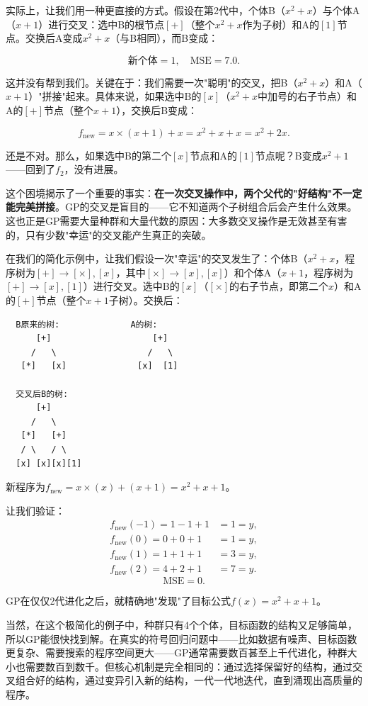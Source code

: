 \documentclass[lang=cn,zihao=-4,a4paper,fontset=windows]{beautybook}
\begin{document}
实际上，让我们用一种更直接的方式。假设在第2代中，个体B（$x^2 + x$）与个体A（$x + 1$）进行交叉：选中B的根节点$[+]$（整个$x^2 + x$作为子树）和A的$[1]$节点。交换后A变成$x^2 + x$（与B相同），而B变成：

\[
\text{新个体} = 1, \quad \text{MSE} = 7.0.
\]

这并没有帮到我们。关键在于：我们需要一次"聪明"的交叉，把B（$x^2 + x$）和A（$x + 1$）"拼接"起来。具体来说，如果选中B的$[x]$（$x^2 + x$中加号的右子节点）和A的$[+]$节点（整个$x+1$），交换后B变成：

\[
f_{\text{new}} = x \times (x + 1) + x = x^2 + x + x = x^2 + 2x.
\]

还是不对。那么，如果选中B的第二个$[x]$节点和A的$[1]$节点呢？B变成$x^2 + 1$——回到了$f_2$，没有进展。

这个困境揭示了一个重要的事实：\textbf{在一次交叉操作中，两个父代的"好结构"不一定能完美拼接}。GP的交叉是盲目的——它不知道两个子树组合后会产生什么效果。这也正是GP需要大量种群和大量代数的原因：大多数交叉操作是无效甚至有害的，只有少数"幸运"的交叉能产生真正的突破。

在我们的简化示例中，让我们假设一次"幸运"的交叉发生了：个体B（$x^2 + x$，程序树为$[+] \to [\times], [x]$，其中$[\times] \to [x], [x]$）和个体A（$x + 1$，程序树为$[+] \to [x], [1]$）进行交叉。选中B的$[x]$（$[\times]$的右子节点，即第二个$x$）和A的$[+]$节点（整个$x+1$子树）。交换后：

\begin{verbatim}
  B原来的树:              A的树:
      [+]                    [+]
     /   \                  /   \
   [*]   [x]              [x]  [1]

  交叉后B的树:
      [+]
     /   \
   [*]   [+]
   / \   / \
  [x] [x][x][1]
\end{verbatim}

新程序为$f_{\text{new}} = x \times (x) + (x + 1) = x^2 + x + 1$。

让我们验证：
\begin{align*}
f_{\text{new}}(-1) = 1 - 1 + 1 &= 1 = y, \\
f_{\text{new}}(0) = 0 + 0 + 1 &= 1 = y, \\
f_{\text{new}}(1) = 1 + 1 + 1 &= 3 = y, \\
f_{\text{new}}(2) = 4 + 2 + 1 &= 7 = y.
\end{align*}
\[
\text{MSE} = 0.
\]

GP在仅仅2代进化之后，就精确地"发现"了目标公式$f(x) = x^2 + x + 1$。

当然，在这个极简化的例子中，种群只有4个个体，目标函数的结构又足够简单，所以GP能很快找到解。在真实的符号回归问题中——比如数据有噪声、目标函数更复杂、需要搜索的程序空间更大——GP通常需要数百甚至上千代进化，种群大小也需要数百到数千。但核心机制是完全相同的：通过选择保留好的结构，通过交叉组合好的结构，通过变异引入新的结构，一代一代地迭代，直到涌现出高质量的程序。
\end{document}
